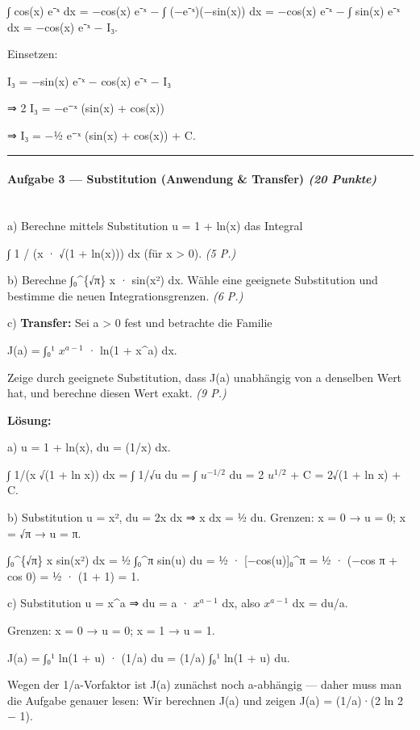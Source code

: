 \documentclass[11pt, a4paper]{article}
\begin{document}
∫ cos(x) e⁻ˣ dx = −cos(x) e⁻ˣ − ∫ (−e⁻ˣ)(−sin(x)) dx = −cos(x) e⁻ˣ − ∫ sin(x) e⁻ˣ dx = −cos(x) e⁻ˣ − I₃.


Einsetzen:

I₃ = −sin(x) e⁻ˣ − cos(x) e⁻ˣ − I₃

⇒ 2 I₃ = −e⁻ˣ (sin(x) + cos(x))

⇒ I₃ = −½ e⁻ˣ (sin(x) + cos(x)) + C.



\noindent\textcolor{rulegray}{\rule{\linewidth}{0.4pt}}


\paragraph{Aufgabe 3 — Substitution (Anwendung \& Transfer) \textit{(20 Punkte)}}\mbox{}\\[2pt]

a) Berechne mittels Substitution u = 1 + ln(x) das Integral

∫ 1 / (x · √(1 + ln(x))) dx (für x > 0). \textit{(5 P.)}


b) Berechne ∫₀\textasciicircum{}\{√π\} x · sin(x²) dx. Wähle eine geeignete Substitution und bestimme die neuen Integrationsgrenzen. \textit{(6 P.)}


c) \textbf{Transfer:} Sei a > 0 fest und betrachte die Familie

J(a) = ∫₀¹ $x^{a−1}$ · ln(1 + x\textasciicircum{}a) dx.

Zeige durch geeignete Substitution, dass J(a) unabhängig von a denselben Wert hat, und berechne diesen Wert exakt. \textit{(9 P.)}


\textbf{Lösung:}


a) u = 1 + ln(x), du = (1/x) dx.

∫ 1/(x √(1 + ln x)) dx = ∫ 1/√u du = ∫ $u^{−1/2}$ du = 2 $u^{1/2}$ + C = 2√(1 + ln x) + C.


b) Substitution u = x², du = 2x dx ⇒ x dx = ½ du. Grenzen: x = 0 → u = 0; x = √π → u = π.

∫₀\textasciicircum{}\{√π\} x sin(x²) dx = ½ ∫₀\textasciicircum{}π sin(u) du = ½ · [−cos(u)]₀\textasciicircum{}π = ½ · (−cos π + cos 0) = ½ · (1 + 1) = 1.


c) Substitution u = x\textasciicircum{}a ⇒ du = a · $x^{a−1}$ dx, also $x^{a−1}$ dx = du/a.

Grenzen: x = 0 → u = 0; x = 1 → u = 1.

J(a) = ∫₀¹ ln(1 + u) · (1/a) du = (1/a) ∫₀¹ ln(1 + u) du.


Wegen der 1/a-Vorfaktor ist J(a) zunächst noch a-abhängig — daher muss man die Aufgabe genauer lesen: Wir berechnen J(a) und zeigen J(a) = (1/a)·(2 ln 2 − 1).
\end{document}
